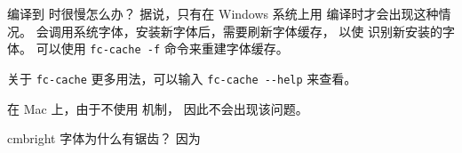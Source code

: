 \begin{myQA}{编译到  时很慢怎么办？}
	据说，只有在 Windows 系统上用  编译时才会出现这种情况。
	 会调用系统字体，安装新字体后，需要刷新字体缓存，
	以使  识别新安装的字体。
	可以使用 \verb|fc-cache -f| 命令来重建字体缓存。
	
	关于 \verb|fc-cache| 更多用法，可以输入 \verb|fc-cache --help| 来查看。
	
	在 Mac 上，由于不使用  机制，
	因此不会出现该问题。
	
\end{myQA}

\begin{myQA}{cmbright 字体为什么有锯齿？}
	因为
\end{myQA}

